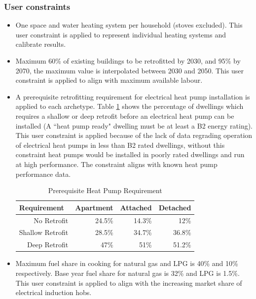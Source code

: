 \documentclass[gmd,manuscript]{copernicus}
\begin{document}
\subsubsection{User constraints}
\begin{itemize}
 \item One space and water heating system per household (stoves excluded). This user constraint is applied to represent individual heating systems and calibrate results.
 \item Maximum 60\% of existing buildings to be retrofitted by 2030, and 95\% by 2070, the maximum value is interpolated between 2030 and 2050. This user constraint is applied to align with maximum available labour.
 \item A prerequisite retrofitting requirement for electrical heat pump installation is applied to each archetype. Table \ref{tab:HeatPumpConstraint} shows the percentage of dwellings which requires a shallow or deep retrofit before an electrical heat pump can be installed (A ``heat pump ready" dwelling must be at least a B2 energy rating). This user constraint is applied because of the lack of data regrading operation of electrical heat pumps in less than B2 rated dwellings, without this constraint heat pumps would be installed in poorly rated dwellings and run at high performance. The constraint aligns with known heat pump performance data.
 \begin{table}[htbp]
  \centering
  \footnotesize
  \caption{Prerequisite Heat Pump Requirement}
    \begin{tabular}{r|rrr}
    \hline
    \multicolumn{1}{l}{Requirement} & \multicolumn{1}{l}{Apartment} & \multicolumn{1}{l}{Attached } & \multicolumn{1}{l}{Detached} \\ \hline
    No Retrofit  & 24.5\%   & 14.3\%   & 12\% \\
    Shallow Retrofit  & 28.5\%   & 34.7\%  & 36.8\% \\
    Deep Retrofit  & 47\%   & 51\%  & 51.2\% \\
    \end{tabular}%
  \label{tab:HeatPumpConstraint}%
\end{table}
\item Maximum fuel share in cooking for natural gas and LPG is 40\% and 10\% respectively. Base year fuel share for natural gas is 32\% and LPG is 1.5\%. This user constraint is applied to align with the increasing market share of electrical induction hobs.
\end{itemize}
\end{document}
